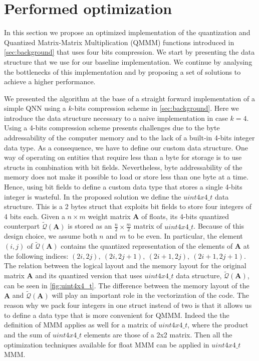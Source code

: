 \section{Performed optimization}\label{sec:yourmethod}
In this section we propose an optimized implementation of the quantization and Quantized Matrix-Matrix Multiplication (QMMM) functions introduced in \cref{sec:background} that uses four bits compression. We start by presenting the data structure that we use for our baseline implementation. We continue by analysing the bottlenecks of this implementation and by proposing a set of solutions to achieve a higher performance.

We presented the algorithm at the base of a straight forward implementation of a simple QNN using a $k$-bits compression scheme in \cref{sec:background}. Here we introduce the data structure necessary to a naive implementation in case $k=4$. Using a 4-bits compression scheme presents challenges due to the byte addressability of the computer memory and to the lack of a built-in 4-bits integer data type. As a consequence, we have to define our custom data structure. One way of operating on entities that require less than a byte for storage is to use structs in combination with bit fields. Nevertheless, byte addressability of the memory does not make it possible to load or store less than one byte at a time. Hence, using bit fields to define a custom data type that stores a single 4-bits integer is wasteful.  In the proposed solution we define the $uint4x4\_t$ data structure. This is a 2 bytes struct that exploits bit fields to store four integers of 4 bits each. Given a $n\times m$ weight matrix $\mathbf{A}$ of floats, its 4-bits quantized counterpart $\tilde{\mathcal{Q}}(\mathbf{A})$ is stored as an $\frac{n}{2}\times \frac{m}{2}$ matrix of $uint4x4\_t$. Because of this design choice, we assume both $n$ and $m$ to be even. In particular, the element $(i, j)$ of $\tilde{\mathcal{Q}}(\mathbf{A})$ contains the quantized representation of the elements of $\mathbf{A}$ at the following indices: $(2i, 2j),~(2i, 2j+1),~(2i+1, 2j),~(2i+1, 2j+1)$. The relation between the logical layout and the memory layout for the original matrix $\mathbf{A}$ and its quantized version that uses $uint4x4\_t$ data structure,   $\tilde{\mathcal{Q}}(\mathbf{A})$, can be seen in \cref{fig:uint4x4_t}. The difference between the memory layout of the $\mathbf{A}$ and $\tilde{\mathcal{Q}}(\mathbf{A})$ will play an important role in the vectorization of the code.
The reason why we pack four integers in one struct instead of two is that it allows us to define a data type that is more convenient for QMMM. Indeed the the definition of MMM applies as well for a matrix of $uint4x4\_t$, where the product and the sum of $uint4x4\_t$ elements are those of a 2x2 matrix. Then all the optimization techniques available for float MMM can be applied in $uint4x4\_t$ MMM.


